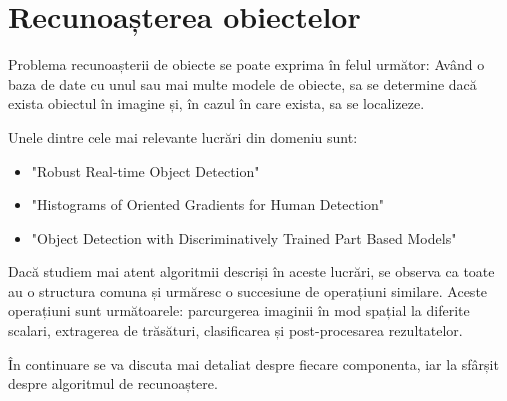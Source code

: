 \chapter{Recunoașterea obiectelor}




Problema recunoașterii de obiecte se poate exprima în felul următor:
Având o baza de date cu unul sau mai multe modele de obiecte, sa se determine dacă exista obiectul în imagine și, în cazul în care exista, sa se localizeze.

Unele dintre cele mai relevante lucrări din domeniu sunt: 
\begin{itemize}
	\item "Robust Real-time Object Detection" \cite{Viola01robustreal-time}
	\item "Histograms of Oriented Gradients for Human Detection" \cite{Dalal05histogramsof}
	\item "Object Detection with Discriminatively Trained Part Based Models" \cite{Felzenszwalb_objectdetection}
\end{itemize}

Dacă studiem mai atent algoritmii descriși în aceste lucrări, se observa ca toate au o structura comuna și urmăresc o succesiune de operațiuni similare.
Aceste operațiuni sunt următoarele: parcurgerea imaginii în mod spațial la diferite scalari, extragerea de trăsături, clasificarea și post-procesarea rezultatelor.

În continuare se va discuta mai detaliat despre fiecare componenta, iar la sfârșit despre algoritmul de recunoaștere.

